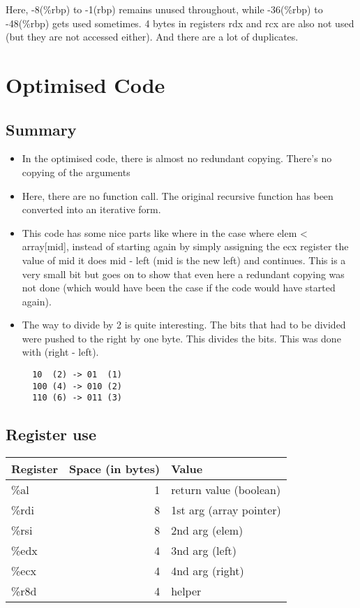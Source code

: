 \documentclass[11pt]{article}
\begin{document}
Here, -8(\%rbp) to -1(rbp) remains unused throughout, while -36(\%rbp) to -48(\%rbp) gets used sometimes. 4 bytes in registers rdx and rcx are also not used (but they are not accessed either). And there are a lot of duplicates.


\section{Optimised Code}
\label{sec:org54bdeeb}

\subsection{Summary}
\label{sec:orgca79f29}
\begin{itemize}
\item In the optimised code, there is almost no redundant copying. There's no copying of the arguments
\item Here, there are no function call. The original recursive function has been converted into an iterative form.
\item This code has some nice parts like where in the case where elem < array[mid], instead of starting again by simply assigning the ecx register the value of mid it does mid - left (mid is the new left) and continues. This is a very small bit but goes on to show that even here a redundant copying was not done (which would have been the case if the code would have started again).
\item The way to divide by 2 is quite interesting. The bits that had to be divided were pushed to the right by one byte. This divides the bits.
This was done with (right - left).
\begin{verbatim}
  10  (2) -> 01  (1)
  100 (4) -> 010 (2)
  110 (6) -> 011 (3)
\end{verbatim}
\end{itemize}


\subsection{Register use}
\label{sec:orge582c46}
\begin{center}
\begin{tabular}{lrl}
\hline
Register & Space (in bytes) & Value\\
\hline
\%al & 1 & return value (boolean)\\
\%rdi & 8 & 1st arg (array pointer)\\
\%rsi & 8 & 2nd arg (elem)\\
\%edx & 4 & 3nd arg (left)\\
\%ecx & 4 & 4nd arg (right)\\
\%r8d & 4 & helper\\
\hline
\end{tabular}
\end{center}
\end{document}
